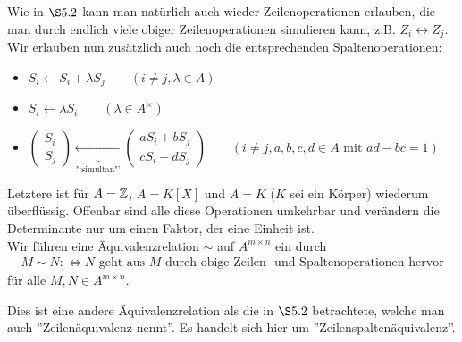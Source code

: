 \documentclass[../../main.tex]{subfiles}
\begin{document}
Wie in $\S5.2$ kann man natürlich auch wieder Zeilenoperationen erlauben, die man durch endlich viele obiger Zeilenoperationen simulieren kann, z.B. $Z_i\longleftrightarrow Z_j$. Wir erlauben nun zusätzlich auch noch die entsprechenden Spaltenoperationen:
\begin{itemize}
\item
$S_i\leftarrow S_i+\lambda S_j
\qquad(i\neq j, \lambda\in A)$
\item
$S_i\leftarrow \lambda S_i\qquad(\lambda\in A^\times)$
\item
$\begin{pmatrix*}S_i\\ S_j\end{pmatrix*}\underbrace{\leftarrow}_\text{"`simultan"'} \begin{pmatrix*}aS_i+bS_j\\ cS_i+dS_j\end{pmatrix*}\qquad( i\neq j, a,b,c,d\in A\text{ mit }ad-bc=1)$
\end{itemize}
Letztere ist für $A=\mathbb Z$, $A=K[X]$ und $A=K$ ($K$ sei ein Körper) wiederum überflüssig. Offenbar sind alle diese Operationen umkehrbar und verändern die Determinante nur um einen Faktor, der eine Einheit ist.\\
Wir führen eine Äquivalenzrelation $\sim$ auf $A^{m\times n}$ ein durch
\begin{align*}
M\sim N:\Longleftrightarrow N \text{ geht aus }M\text{ durch obige Zeilen- und Spaltenoperationen hervor}
\end{align*}
für alle $M,N\in A^{m\times n}$.

\begin{warning}\label{17.1.1}
Dies ist eine andere Äquivalenzrelation als die in $\S5.2$ betrachtete, welche man auch ''Zeilenäquivalenz nennt''. Es handelt sich hier um ''Zeilenspaltenäquivalenz''.
\end{warning}
\end{document}
